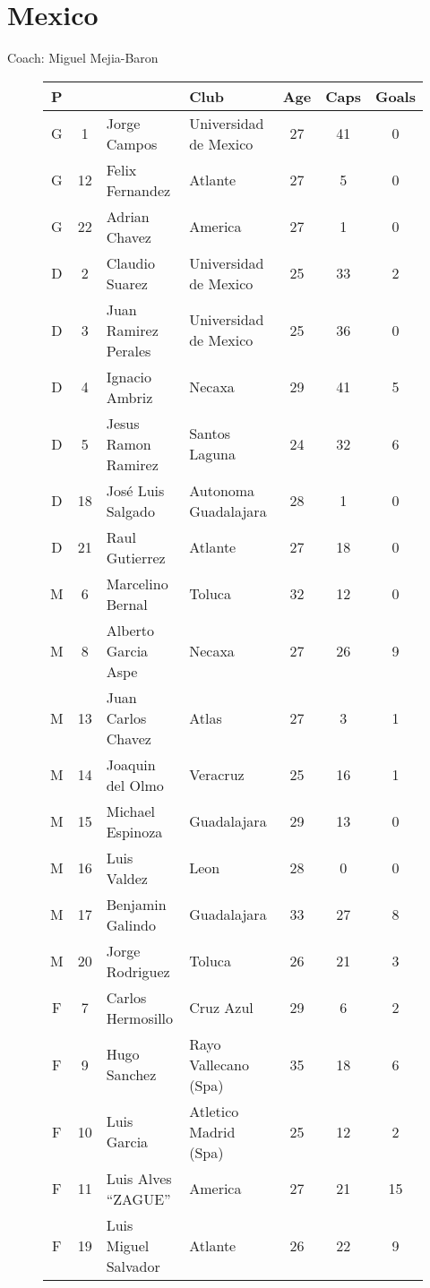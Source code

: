 \chapter{Mexico}
\newline
\newline
Coach: Miguel Mejia-Baron
\begin{figure}[H]
\begin{tabular}{c c l l c c c}
P & & & Club & Age & Caps & Goals \\ \hline
G & 1 & Jorge Campos & Universidad de Mexico & 27 & 41 & 0 \\
G &12 & Felix Fernandez & Atlante & 27 & 5 & 0 \\
G & 22 & Adrian Chavez & America & 27 & 1 & 0 \\ \hline
D & 2 & Claudio Suarez & Universidad de Mexico & 25 & 33 & 2 \\
D & 3 & Juan Ramirez Perales & Universidad de Mexico & 25 & 36 & 0 \\
D & 4 & Ignacio Ambriz & Necaxa & 29 & 41 & 5 \\
D & 5 & Jesus Ramon Ramirez & Santos Laguna & 24 & 32 & 6 \\
D & 18 & Jos{\'e} Luis Salgado & Autonoma Guadalajara &  28 & 1 & 0 \\
D & 21 & Raul Gutierrez & Atlante & 27 & 18 & 0 \\ \hline
M & 6 & Marcelino Bernal & Toluca & 32 & 12 & 0 \\
M & 8 & Alberto Garcia Aspe & Necaxa & 27 & 26 & 9 \\
M & 13 & Juan Carlos Chavez & Atlas & 27 & 3 & 1 \\
M & 14 & Joaquin del Olmo & Veracruz & 25 & 16 & 1 \\
M & 15 & Michael Espinoza & Guadalajara & 29 & 13 & 0 \\
M & 16 & Luis Valdez & Leon & 28 & 0 & 0 \\
M & 17 & Benjamin Galindo & Guadalajara &  33 & 27 & 8 \\
M & 20 & Jorge Rodriguez &  Toluca &  26 & 21 & 3 \\ \hline
F & 7 & Carlos Hermosillo &Cruz Azul & 29 & 6 & 2 \\
F & 9 & Hugo Sanchez & Rayo Vallecano (Spa) & 35 & 18 & 6 \\
F & 10 & Luis Garcia & Atletico Madrid (Spa) & 25 & 12 & 2 \\
F & 11 & Luis Alves ``ZAGUE'' & America & 27 & 21 & 15 \\
F & 19 & Luis Miguel Salvador & Atlante & 26 & 22 & 9 \\ \hline
\end{tabular}
\end{figure}
